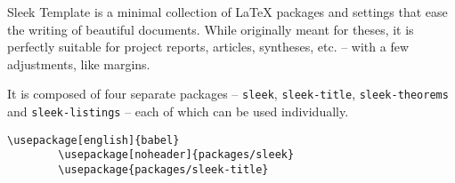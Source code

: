     Sleek Template is a minimal collection of \LaTeX{} packages and settings that ease the writing of beautiful documents. While originally meant for theses, it is perfectly suitable for project reports, articles, syntheses, etc. -- with a few adjustments, like margins.

    It is composed of four separate packages -- \texttt{sleek}, \texttt{sleek-title}, \texttt{sleek-theorems} and \texttt{sleek-listings} -- each of which can be used individually.

    \begin{lstlisting}[style=latexFrameTB, caption={Example of Sleek Template packages usage.}, gobble=8]
        \usepackage[english]{babel}
        \usepackage[noheader]{packages/sleek}
        \usepackage{packages/sleek-title}
    \end{lstlisting}

